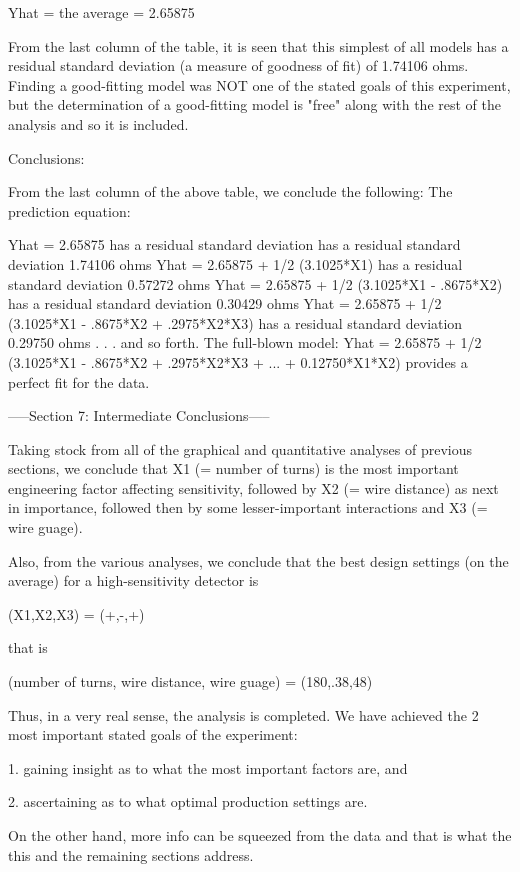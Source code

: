       Yhat = the average = 2.65875

From the last column of the table, it is seen that
this simplest of all models has a residual
standard deviation (a measure of goodness of fit)
of 1.74106 ohms.  Finding a good-fitting model was
NOT one of the stated goals of this experiment,
but the determination of a good-fitting model is
"free" along with the rest of the analysis and so
it is included.

Conclusions:

From the last column of the above table, we
conclude the following: The prediction equation:

   Yhat = 2.65875 has a residual standard deviation
          has a residual standard deviation 1.74106 ohms
   Yhat = 2.65875 + 1/2 (3.1025*X1)
          has a residual standard deviation 0.57272 ohms
   Yhat = 2.65875 + 1/2 (3.1025*X1 - .8675*X2)
          has a residual standard deviation 0.30429 ohms
   Yhat = 2.65875 + 1/2 (3.1025*X1 - .8675*X2 + .2975*X2*X3)
          has a residual standard deviation 0.29750 ohms
   .
   .
   .
   and so forth.  The full-blown model:
   Yhat = 2.65875 + 1/2 (3.1025*X1 - .8675*X2 + .2975*X2*X3
          + ... + 0.12750*X1*X2) provides a perfect fit for the data.

-----Section 7: Intermediate Conclusions-----

Taking stock from all of the graphical and
quantitative analyses of previous sections, we
conclude that X1 (= number of turns) is the most
important engineering factor affecting
sensitivity, followed by X2 (= wire distance) as
next in importance, followed then by some
lesser-important interactions and X3 (= wire
guage).

Also, from the various analyses, we conclude that
the best design settings (on the average) for a
high-sensitivity detector is

   (X1,X2,X3) = (+,-,+)

that is

   (number of turns, wire distance, wire guage) = (180,.38,48)

Thus, in a very real sense, the analysis is
completed.  We have achieved the 2 most important
stated goals of the experiment:

   1. gaining insight as to what the most
      important factors are, and

   2. ascertaining as to what optimal production
      settings are.

On the other hand, more info can be squeezed from
the data and that is what the this and the
remaining sections address.

